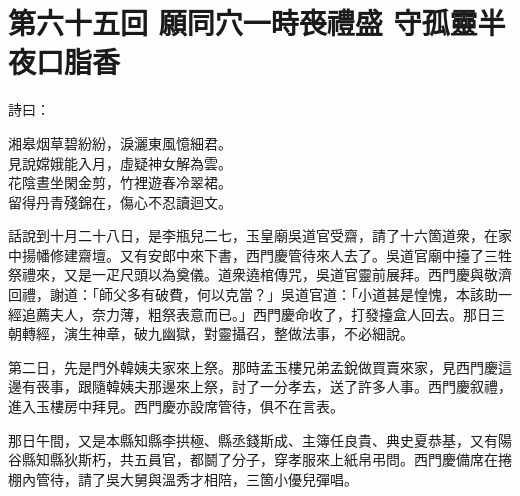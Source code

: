 
\chapter*{第六十五回 願同穴一時䘮禮盛 守孤靈半夜口脂香}


詩曰：

\begin{myquote} 
湘皋烟草碧紛紛，淚灑東風憶細君。\\見說嫦娥能入月，虛疑神女解為雲。\\花陰晝坐閑金剪，竹裡遊春冷翠裙。\\留得丹青殘錦在，傷心不忍讀迴文。
\end{myquote} 

話說到十月二十八日，是李瓶兒二七，玉皇廟吳道官受齋，請了十六箇道衆，在家中揚幡修建齋壇。又有安郎中來下書，西門慶管待來人去了。吳道官廟中擡了三牲祭禮來，又是一疋尺頭以為奠儀。道衆遶棺傳咒，吳道官靈前展拜。西門慶與敬濟回禮，謝道：「師父多有破費，何以克當？」吳道官道：「小道甚是惶愧，本該助一經追薦夫人，奈力薄，粗祭表意而已。」西門慶命收了，打發擡盒人回去。那日三朝轉經，演生神章，破九幽獄，對靈攝召，整做法事，不必細說。

第二日，先是門外韓姨夫家來上祭。那時孟玉樓兄弟孟銳做買賣來家，{}見西門慶這邊有䘮事，跟隨韓姨夫那邊來上祭，討了一分孝去，送了許多人事。西門慶叙禮，進入玉樓房中拜見。西門慶亦設席管待，俱不在言表。

那日午間，又是本縣知縣李拱極、縣丞錢斯成、主簿任良貴、典史夏恭基，又有陽谷縣知縣狄斯朽，共五員官，都鬬了分子，穿孝服來上紙帛弔問。西門慶備席在捲棚內管待，請了吳大舅與溫秀才相陪，三箇小優兒彈唱。

